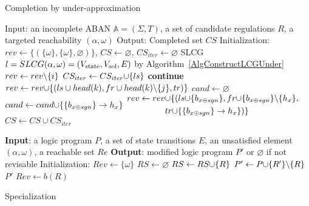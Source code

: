 \begin{algorithm}[ht]
\caption{Completion by under-approximation}\label{algComUnder}
\begin{algorithmic}
\State Input: an incomplete ABAN $\mathbb{A}=(\Sigma,T)$, a set of candidate regulations $R$, a targeted reachability $(\alpha,\omega)$
\State Output: Completed set $CS$ %
\State Initialization: $rev\gets\{(\{\omega\},\{\omega\},\varnothing)\}$, $CS\gets \varnothing$, $CS_{iter}\gets \varnothing$
\Do
\State SLCG $l=SLCG(\alpha,\omega)=(V_{\mathrm{state}},V_{\mathrm{sol}}, E)$ by Algorithm~\ref{AlgConstructLCGUnder}
        \State $rev\gets rev \miset{i}$
            \State $CS_{iter}\gets CS_{iter}\addset{ls}$
            \State \textbf{continue}
        \EndIf
                    \State $rev\gets rev\addset{(ls\cup head(k), fr\cup head(k)\miset{j},tr)}$
                \EndIf
            \EndFor
        \EndFor
        \State $cand\gets\varnothing$
                \State $cand \gets cand\addset{\acm{b_{x \oplus sgn}}{h_{1-x}}{h_x}}$
                \State 
                    $\begin{aligned}
                        rev\gets rev&\addset{(ls\addset{b_{x \oplus sgn}}, fr\addset{b_{x \oplus sgn}}\miset{h_x},\\
                        &tr\addset{\acm{b_{x \oplus sgn}}{h_{1-x}}{h_x}})}
                    \end{aligned}$
            \EndIf
        \EndFor
    \EndFor
\EndWhile
\State $CS\gets CS\cup CS_{iter}$
\State {}
\end{algorithmic}
\end{algorithm}

\begin{algorithm}[ht]
\begin{algorithmic}
    \State \textbf{Input}: a logic program $P$, a set of state transitions $E$, an unsatisfied element $(\alpha,\omega)$, a reachable set $Re$
    \State \textbf{Output}: modified logic program $P'$ or $\varnothing$ if not revisable
    \State Initialization: $Rev\gets\{\omega\}$
    \Do
    \State $RS\gets \varnothing$
            \State $RS\gets RS\addset{R}$
        \EndIf
    \EndFor
            \State $P'\gets P\addset{R'}\miset{R}$
                    \State\Return $P'$
                \EndIf
            \EndIf
        \EndFor
    \EndFor
        \State $Rev\gets b(R)$
    \EndFor
\end{algorithmic}
\caption{Specialization}\label{alg:specialization}
\end{algorithm}


